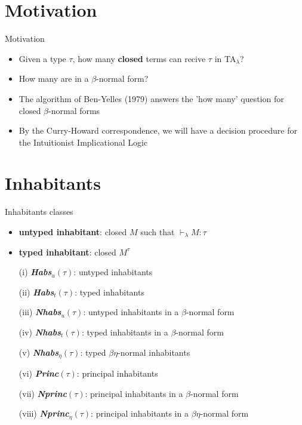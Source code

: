 \section{Motivation}

\begin{frame}{Motivation}

\begin{itemize}
 \item Given a type $\tau$, how many \textbf{closed} terms can recive $\tau$ in TA$_{\lambda}$?\\[0.5cm]
 \item How many are in a $\beta$-normal form?\\[0.5cm]
 \item The algorithm of Ben-Yelles (1979) answers the 'how many' question for closed $\beta$-normal forms\\[0.5cm]
 \item By the Curry-Howard correspondence, we will have a decision procedure for the Intuitionist Implicational Logic 
\end{itemize}


 
\end{frame}

\section{Inhabitants}

\begin{frame}{Inhabitants classes}

\begin{mydef}[Inhabitants]
\begin{itemize}
 \item \textbf{untyped inhabitant}: closed $M$ such that $\vdash_{\lambda} M : \tau$
 \item \textbf{typed inhabitant}: closed $M^{\tau}$
\end{itemize}
\end{mydef}

\begin{itemize} 
 \item[(i)]  \textbf{\textit{Habs}$_u(\tau)$}: untyped inhabitants
 \item[(ii)] \textbf{\textit{Habs}$_t(\tau)$}: typed inhabitants
 \item[(iii)]\textbf{\textit{Nhabs}$_u(\tau)$}: untyped inhabitants in a $\beta$-normal form
 \item[(iv)]\textbf{\textit{Nhabs}$_t(\tau)$}: typed inhabitants in a $\beta$-normal form
 \item[(v)]\textbf{\textit{Nhabs}$_{\eta}(\tau)$}: typed $\beta\eta$-normal inhabitants
 \item[(vi)]\textbf{\textit{Princ}$(\tau)$}: principal inhabitants
 \item[(vii)]\textbf{\textit{Nprinc}$(\tau)$}: principal inhabitants in a $\beta$-normal form
 \item[(viii)]\textbf{\textit{Nprinc}$_{\eta}(\tau)$}: principal inhabitants in a $\beta\eta$-normal form
\end{itemize}

\end{frame}

